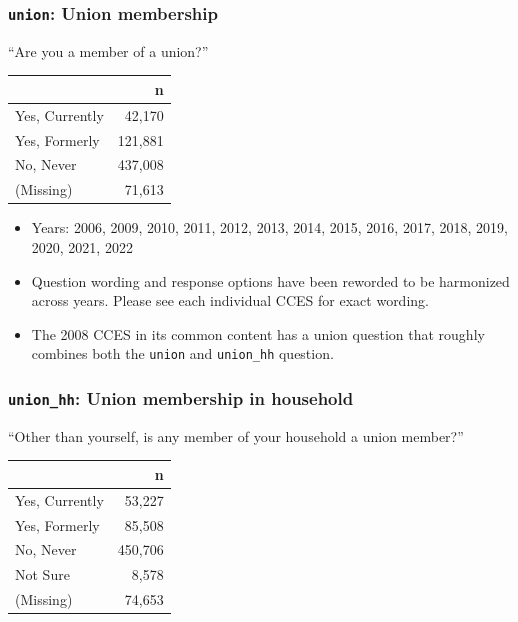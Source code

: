 \documentclass[10pt,article,oneside]{memoir}
\theoremstyle{definition}
\begin{document}
\subsubsection{\texorpdfstring{\texttt{union}: Union
membership}{union: Union membership}}\label{union-union-membership}

``Are you a member of a union?''

\begin{table}[H]
\centering
\begin{tabular}[t]{lr}
\toprule
 & n\\
\midrule
Yes, Currently & 42,170\\
Yes, Formerly & 121,881\\
No, Never & 437,008\\
(Missing) & 71,613\\
\bottomrule
\end{tabular}
\end{table}

\begin{itemize}
\tightlist
\item
  Years: 2006, 2009, 2010, 2011, 2012, 2013, 2014, 2015, 2016, 2017,
  2018, 2019, 2020, 2021, 2022
\item
  Question wording and response options have been reworded to be
  harmonized across years. Please see each individual CCES for exact
  wording.
\item
  The 2008 CCES in its common content has a union question that roughly
  combines both the \texttt{union} and \texttt{union\_hh} question.
\end{itemize}

\subsubsection{\texorpdfstring{\texttt{union\_hh}: Union membership in
household}{union\_hh: Union membership in household}}\label{union_hh-union-membership-in-household}

``Other than yourself, is any member of your household a union member?''

\begin{table}[H]
\centering
\begin{tabular}[t]{lr}
\toprule
 & n\\
\midrule
Yes, Currently & 53,227\\
Yes, Formerly & 85,508\\
No, Never & 450,706\\
Not Sure & 8,578\\
(Missing) & 74,653\\
\bottomrule
\end{tabular}
\end{table}
\end{document}
